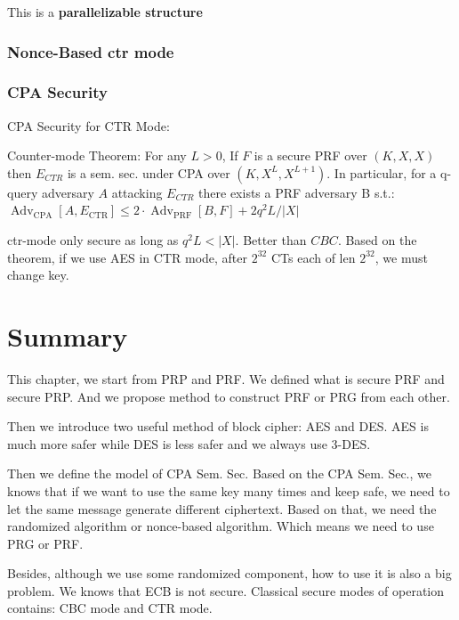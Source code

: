 This is a \textbf{parallelizable structure}

\subsubsection{Nonce-Based ctr mode}


\subsubsection{CPA Security}

\begin{theorem}  CPA Security for CTR Mode:

    Counter-mode Theorem: For any $L>0$,
    If $F$ is a secure PRF over $(K, X, X)$ then
    $E_{C T R}$ is a sem. sec. under CPA over $\left(K, X^{L}, X^{L+1}\right)$.
    In particular, for a q-query adversary $A$ attacking $E_{C T R}$
    there exists a PRF adversary B s.t.:
    $\operatorname{Adv}_{\mathrm{CPA}}\left[A, E_{\mathrm{CTR}}\right] \leq 2 \cdot \operatorname{Adv}_{\mathrm{PRF}}[B, F]+2 q^{2} L /|X|$
    
\end{theorem}

ctr-mode only secure as long as $q^{2} L<|X|$. Better than $C B C$. Based on the theorem, if we use AES in CTR mode, after $2^32$ CTs each of len $2^32$, we must change key. 

\section{Summary}
This chapter, we start from PRP and PRF. We defined what is secure PRF and secure PRP. And we propose method to construct PRF or PRG from each other. 

Then we introduce two useful method of block cipher: AES and DES. AES is much more safer while DES is less safer and we always use 3-DES.

Then we define the model of CPA Sem. Sec. Based on the CPA Sem. Sec., we knows that if we want to use the same key many times and keep safe, we need to let the same message generate different ciphertext. Based on that, we need the randomized algorithm or nonce-based algorithm. Which means we need to use PRG or PRF.

Besides, although we use some randomized component, how to use it is also a big problem. We knows that ECB is not secure. Classical secure modes of operation contains: CBC mode and CTR mode.